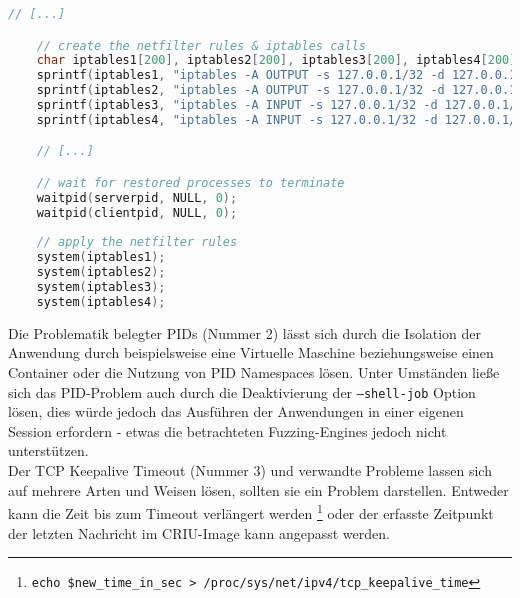 \documentclass[a4paper]{article}
\begin{document}
\begin{lstlisting}[caption=Setzen der Firewallregeln, language=C]
    // [...]

    // create the netfilter rules & iptables calls
    char iptables1[200], iptables2[200], iptables3[200], iptables4[200];
    sprintf(iptables1, "iptables -A OUTPUT -s 127.0.0.1/32 -d 127.0.0.1/32 -p tcp -m mark ! --mark 0xc114 -m tcp --sport %i --dport %i -j DROP", clientport, serverport);
    sprintf(iptables2, "iptables -A OUTPUT -s 127.0.0.1/32 -d 127.0.0.1/32 -p tcp -m mark ! --mark 0xc114 -m tcp --sport %i --dport %i -j DROP", serverport, clientport);
    sprintf(iptables3, "iptables -A INPUT -s 127.0.0.1/32 -d 127.0.0.1/32 -p tcp -m mark ! --mark 0xc114 -m tcp --sport %i --dport %i -j DROP", clientport, serverport);
    sprintf(iptables4, "iptables -A INPUT -s 127.0.0.1/32 -d 127.0.0.1/32 -p tcp -m mark ! --mark 0xc114 -m tcp --sport %i --dport %i -j DROP", serverport, clientport);

    // [...]

    // wait for restored processes to terminate
    waitpid(serverpid, NULL, 0);
    waitpid(clientpid, NULL, 0);
    
    // apply the netfilter rules
    system(iptables1);
    system(iptables2);
    system(iptables3);
    system(iptables4);
\end{lstlisting}
Die Problematik belegter PIDs (Nummer 2) lässt sich durch die Isolation der Anwendung durch beispielsweise eine Virtuelle Maschine beziehungsweise einen Container oder die Nutzung von PID Namespaces lösen. 
Unter Umständen ließe sich das PID-Problem auch durch die Deaktivierung der \texttt{--shell-job} Option lösen, dies würde jedoch das Ausführen der Anwendungen in einer eigenen Session erfordern - etwas die betrachteten Fuzzing-Engines jedoch nicht unterstützen.\\
Der TCP Keepalive Timeout (Nummer 3) und verwandte Probleme lassen sich auf mehrere Arten und Weisen lösen, sollten sie ein Problem darstellen. Entweder kann die Zeit bis zum Timeout verlängert werden \footnote{\texttt{echo \$new\_time\_in\_sec > /proc/sys/net/ipv4/tcp\_keepalive\_time}} oder der erfasste Zeitpunkt der letzten Nachricht im CRIU-Image kann angepasst werden.
\end{document}

